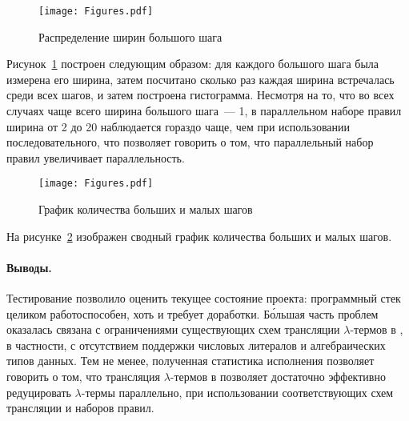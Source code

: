 \begin{figure}
    \begin{center}
        \texttt{[image: Figures.pdf]}
    \end{center}
    \caption{Распределение ширин большого шага}
    \label{fig:fact_distr}
\end{figure}

Рисунок~\ref{fig:fact_distr} построен следующим образом: для каждого большого шага была измерена его ширина, затем посчитано сколько раз каждая ширина встречалась среди всех шагов, и затем построена гистограмма.
Несмотря на то, что во всех случаях чаще всего ширина большого шага~--- 1, в параллельном наборе правил ширина от 2 до 20 наблюдается гораздо чаще, чем при использовании последовательного, что позволяет говорить о том, что параллельный набор правил увеличивает параллельность.

\begin{figure}
    \begin{center}
        \texttt{[image: Figures.pdf]}
    \end{center}
    \caption{График количества больших и малых шагов}
    \label{fig:fact_red}
\end{figure}

На рисунке~\ref{fig:fact_red} изображен сводный график количества больших и малых шагов.

\paragraph{Выводы.}

Тестирование позволило оценить текущее состояние проекта: программный стек целиком работоспособен, хоть и требует доработки.
Б\'ольшая часть проблем оказалась связана с ограничениями существующих схем трансляции $\lambda$-термов в \INs{}, в частности, с отсутствием поддержки числовых литералов и алгебраических типов данных.
Тем не менее, полученная статистика исполнения позволяет говорить о том, что трансляция $\lambda$-термов в \INs{} позволяет достаточно эффективно редуцировать $\lambda$-термы параллельно, при использовании соответствующих схем трансляции и наборов правил.
